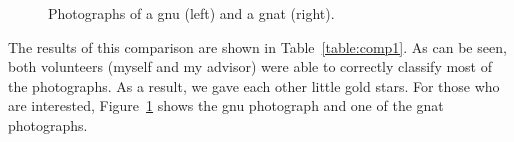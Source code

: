 \documentclass[12pt]{thesis}
\begin{document}
\begin{figure}
\begin{center}
\end{center}
\caption{Photographs of a gnu (left) and a gnat (right).}
\label{figure:photos}
\end{figure}

The results of this comparison are shown in Table~\ref{table:comp1}.
As can be seen, both volunteers (myself and my advisor) were able to
correctly classify most of the photographs.  As a result, we gave each
other little gold stars.
For those who are interested, Figure~\ref{figure:photos} shows the gnu
photograph and one of the gnat photographs.
\end{document}
